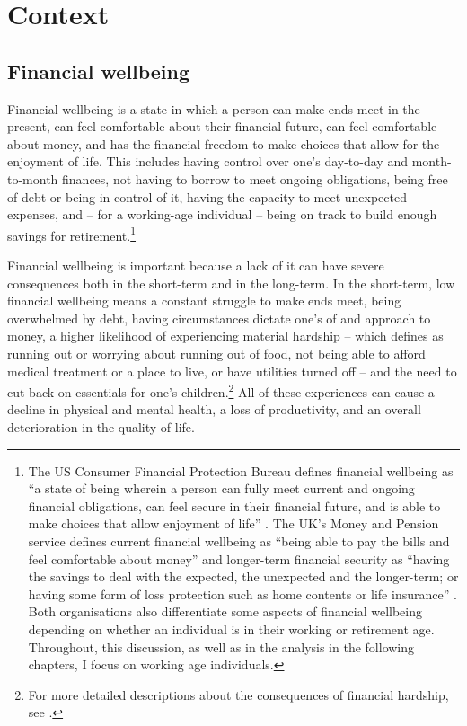 
\section{Context}%
\label{sec:context}

\subsection{Financial wellbeing}%
\label{sub:financial_wellbeing_and_why_it_matters}

Financial wellbeing is a state in which a person can make ends meet in the
present, can feel comfortable about their financial future, can feel
comfortable about money, and has the financial freedom to make choices that
allow for the enjoyment of life. This includes having control over one's
day-to-day and month-to-month finances, not having to borrow to meet
ongoing obligations, being free of debt or being in control of it, having the
capacity to meet unexpected expenses, and -- for a working-age individual --
being on track to build enough savings for retirement.\footnote{The US Consumer
    Financial Protection Bureau defines financial wellbeing as ``a state of
    being wherein a person can fully meet current and ongoing financial
    obligations, can feel secure in their financial future, and is able to make
    choices that allow enjoyment of life'' \citep{cfpb2015financial}. The UK's
    Money and Pension service defines current financial wellbeing as ``being
    able to pay the bills and feel comfortable about money'' and longer-term
    financial security as ``having the savings to deal with the expected, the
    unexpected and the longer-term; or having some form of loss protection such
    as home contents or life insurance'' \citep{mps2018building}. Both
    organisations also differentiate some aspects of financial wellbeing
    depending on whether an individual is in their working or retirement age.
Throughout, this discussion, as well as in the analysis in the following
chapters, I focus on working age individuals.}

Financial wellbeing is important because a lack of it can have severe
consequences both in the short-term and in the long-term. In the short-term,
low financial wellbeing means a constant struggle to make ends meet, being
overwhelmed by debt, having circumstances dictate one's of and approach to
money, a higher likelihood of experiencing material hardship -- which
\citep{cfpb2017financial} defines as running out or worrying about running out
of food, not being able to afford medical treatment or a place to live, or have
utilities turned off -- and the need to cut back on essentials for one's
children.\footnote{For more detailed descriptions about the consequences of
    financial hardship, see \citet{cfpb2017financial, mps2018building,
stepchange2017strengthening}.} All of these experiences can cause a decline in
physical and mental health, a loss of productivity, and an overall
deterioration in the quality of life.

